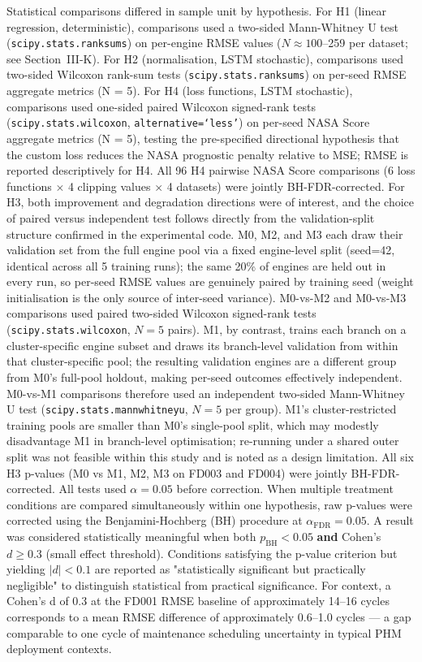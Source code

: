 \documentclass[review,12pt]{elsarticle}
\begin{document}
Statistical comparisons differed in sample unit by hypothesis. For H1 (linear regression, deterministic), comparisons used a two-sided Mann-Whitney U test (\texttt{scipy.stats.ranksums}) on per-engine RMSE values ($N \approx 100$--259 per dataset; see Section~III-K). For H2 (normalisation, LSTM stochastic), comparisons used two-sided Wilcoxon rank-sum tests (\texttt{scipy.stats.ranksums}) on per-seed RMSE aggregate metrics (N = 5). For H4 (loss functions, LSTM stochastic), comparisons used one-sided paired Wilcoxon signed-rank tests (\texttt{scipy.stats.wilcoxon}, \texttt{alternative=`less'}) on per-seed NASA Score aggregate metrics (N = 5), testing the pre-specified directional hypothesis that the custom loss reduces the NASA prognostic penalty relative to MSE; RMSE is reported descriptively for H4. All 96 H4 pairwise NASA Score comparisons (6 loss functions $\times$ 4 clipping values $\times$ 4 datasets) were jointly BH-FDR-corrected. For H3, both improvement and degradation directions were of interest, and the choice of paired versus independent test follows directly from the validation-split structure confirmed in the experimental code. M0, M2, and M3 each draw their validation set from the full engine pool via a fixed engine-level split (seed=42, identical across all 5 training runs); the same 20\% of engines are held out in every run, so per-seed RMSE values are genuinely paired by training seed (weight initialisation is the only source of inter-seed variance). M0-vs-M2 and M0-vs-M3 comparisons used paired two-sided Wilcoxon signed-rank tests (\texttt{scipy.stats.wilcoxon}, $N = 5$ pairs). M1, by contrast, trains each branch on a cluster-specific engine subset and draws its branch-level validation from within that cluster-specific pool; the resulting validation engines are a different group from M0's full-pool holdout, making per-seed outcomes effectively independent. M0-vs-M1 comparisons therefore used an independent two-sided Mann-Whitney U test (\texttt{scipy.stats.mannwhitneyu}, $N = 5$ per group). M1's cluster-restricted training pools are smaller than M0's single-pool split, which may modestly disadvantage M1 in branch-level optimisation; re-running under a shared outer split was not feasible within this study and is noted as a design limitation. All six H3 p-values (M0 vs M1, M2, M3 on FD003 and FD004) were jointly BH-FDR-corrected. All tests used $\alpha = 0.05$ before correction. When multiple treatment conditions are compared simultaneously within one hypothesis, raw p-values were corrected using the Benjamini-Hochberg (BH) procedure at $\alpha_{\text{FDR}} = 0.05$. A result was considered statistically meaningful when both $p_{\text{BH}} < 0.05$ \textbf{and} Cohen's $d \geq 0.3$ (small effect threshold). Conditions satisfying the p-value criterion but yielding $|d| < 0.1$ are reported as "statistically significant but practically negligible" to distinguish statistical from practical significance. For context, a Cohen's d of 0.3 at the FD001 RMSE baseline of approximately 14–16 cycles corresponds to a mean RMSE difference of approximately 0.6–1.0 cycles — a gap comparable to one cycle of maintenance scheduling uncertainty in typical PHM deployment contexts.
\end{document}
